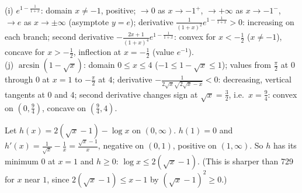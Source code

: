 (i) $e^{1-\frac1{1+x}}$: domain $x\ne-1$, positive; $\to0$ as $x\to-1^+$, $\to+\infty$ as $x\to-1^-$, $\to e$ as $x\to\pm\infty$ (asymptote $y=e$); derivative $\frac1{(1+x)^2}e^{1-\frac1{1+x}}>0$: increasing on each branch; second derivative $-\frac{2x+1}{(1+x)^4}e^{1-\frac1{1+x}}$: convex for $x<-\frac12$ ($x\ne-1$), concave for $x>-\frac12$, inflection at $x=-\frac12$ (value $e^{-1}$).\\
(j) $\arcsin(1-\sqrt x)$: domain $0\le x\le4$ ($-1\le1-\sqrt x\le1$); values from $\frac\pi2$ at $0$ through $0$ at $x=1$ to $-\frac\pi2$ at $4$; derivative $-\frac1{2\sqrt x\sqrt{2\sqrt x-x}}<0$: decreasing, vertical tangents at $0$ and $4$; second derivative changes sign at $\sqrt x=\frac32$, i.e.\ $x=\frac94$: convex on $(0,\frac94)$, concave on $(\frac94,4)$.

 Let $h(x)=2(\sqrt x-1)-\log x$ on $(0,\infty)$. $h(1)=0$ and $h'(x)=\frac1{\sqrt x}-\frac1x=\frac{\sqrt x-1}x$, negative on $(0,1)$, positive on $(1,\infty)$. So $h$ has its minimum $0$ at $x=1$ and $h\ge0$: $\log x\le2(\sqrt x-1)$. (This is sharper than 729 for $x$ near $1$, since $2(\sqrt x-1)\le x-1$ by $(\sqrt x-1)^2\ge0$.)
